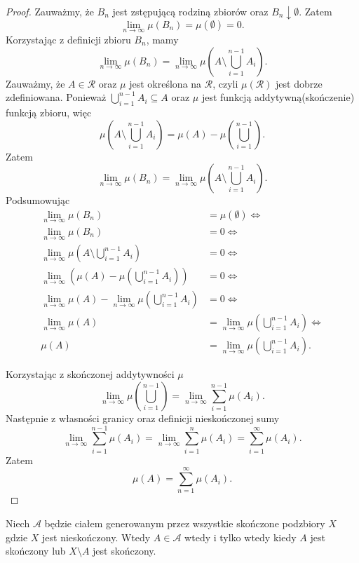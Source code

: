 \begin{proof}
	Zauważmy, że $B_{n}$ jest zstępującą rodziną zbiorów oraz $B_{n}\downarrow \emptyset $. Zatem 
	\[
	\lim_{n \to \infty} \mu\left( B_{n} \right) = \mu\left( \emptyset  \right) = 0
	.\] 
	Korzystając z definicji zbioru $B_{n}$, mamy
	\[
	\lim_{n \to \infty} \mu\left( B_{n} \right) = \lim_{n \to \infty}\mu\left( A\setminus \bigcup_{i=1} ^{n-1}A_{i} \right) 
	.\] 
	Zauważmy, że $A\in \mathcal{R}$ oraz $\mu$ jest określona na $\mathcal{R}$, czyli $\mu\left( \mathcal{R} \right)$ jest dobrze zdefiniowana. Ponieważ $\bigcup_{i=1} ^{n-1}A_{i}\subseteq A$ oraz $\mu$ jest funkcją addytywną(skończenie) funkcją zbioru, więc
	\[
	\mu\left( A\setminus \bigcup_{i=1} ^{n-1}A_{i}  \right) = \mu\left( A \right) - \mu\left( \bigcup_{i=1}^{n-1} \right) 
	.\] 
	Zatem
	\[
	\lim_{n \to \infty} \mu\left( B_{n} \right) = \lim_{n \to \infty} \mu\left( A\setminus \bigcup_{i=1} ^{n-1}A_{i} \right) 
	.\] 
	Podsumowując
	\begin{align*}	
		\lim_{n \to \infty} \mu\left( B_{n} \right) &= \mu\left( \emptyset  \right) \iff \\
		\lim_{n \to \infty} \mu\left( B_{n} \right) &= 0 \iff \\
		\lim_{n \to \infty} \mu\left( A\setminus \bigcup_{i=1} ^{n-1}A_{i} \right) &= 0 \iff \\
		\lim_{n \to \infty} \left(  \mu\left( A\right) - \mu\left(\bigcup_{i=1} ^{n-1}A_{i} \right)\right) &= 0 \iff \\
		\lim_{n \to \infty} \mu\left( A \right) - \lim_{n \to \infty} \mu\left( \bigcup_{i=1} ^{n-1}A_{i} \right) &= 0 \iff \\
		\lim_{n \to \infty} \mu\left( A \right) &= \lim_{n \to \infty} \mu\left( \bigcup_{i=1} ^{n-1}A_{i} \right) \iff \\
		\mu\left( A \right) &= \lim_{n \to \infty} \mu\left( \bigcup_{i=1} ^{n-1}A_{i} \right) 
	.\end{align*} 

	Korzystając z skończonej addytywności $\mu$ 
	 \[
	\lim_{n \to \infty} \mu\left( \bigcup_{i=1}^{n-1} \right) = \lim_{n \to \infty} \sum_{i=1}^{n-1} \mu\left( A_{i} \right) 
	.\] 
	Następnie z własności granicy oraz definicji nieskończonej sumy
	\[
	\lim_{n \to \infty} \sum_{i=1}^{n-1} \mu\left( A_{i} \right) = \lim_{n \to \infty} \sum_{i=1}^{n} \mu\left( A_{i} \right) = \sum_{i=1}^{\infty} \mu\left( A_{i} \right) 
	.\] 
	Zatem
	\[
	\mu\left( A \right) = \sum_{n = 1}^{\infty} \mu\left( A_{i} \right) 
	.\] 
\end{proof} 
\begin{eg}
	Niech $\mathcal{A}$ będzie ciałem generowanym przez wszystkie skończone podzbiory $X$ gdzie $X$ jest nieskończony. Wtedy $A\in \mathcal{A}$ wtedy i tylko wtedy kiedy $A$ jest skończony lub $X\setminus A$ jest skończony.
\end{eg} 
